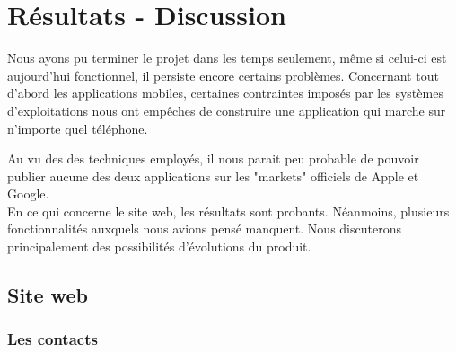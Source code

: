 \cleardoublepage



\chapter{Résultats - Discussion}

Nous ayons pu terminer le projet dans les temps seulement, même si celui-ci est aujourd'hui fonctionnel, il persiste encore certains problèmes.
Concernant tout d'abord les applications mobiles, certaines contraintes imposés par les systèmes d'exploitations nous ont empêches de construire une application qui marche sur n'importe quel téléphone.

Au vu des des techniques employés, il nous parait peu probable de pouvoir publier aucune des
deux applications sur les "markets" officiels de Apple et Google. %
\\


En ce qui concerne le site web, les résultats sont probants.
Néanmoins, plusieurs fonctionnalités auxquels nous avions pensé manquent.
Nous discuterons principalement des possibilités d'évolutions du produit.
\\






\section{Site web}


\subsection{Les contacts}


